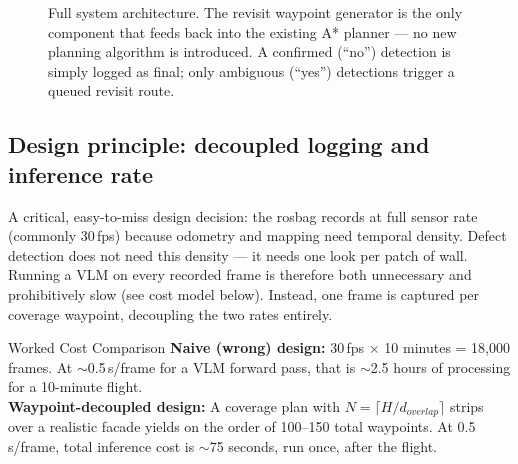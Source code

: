 \documentclass[11pt,a4paper]{article}
\begin{document}
\begin{figure}[h!]
\caption{Full system architecture. The revisit waypoint generator is the only component that feeds back into the existing A* planner --- no new planning algorithm is introduced. A confirmed (``no'') detection is simply logged as final; only ambiguous (``yes'') detections trigger a queued revisit route.}
\label{fig:architecture}
\end{figure}

\subsection{Design principle: decoupled logging and inference rate}
\label{sec:decoupled}

A critical, easy-to-miss design decision: the rosbag records at full sensor rate (commonly 30\,fps) because odometry and mapping need temporal density. Defect detection does not need this density --- it needs one look per patch of wall. Running a VLM on every recorded frame is therefore both unnecessary and prohibitively slow (see cost model below). Instead, one frame is captured per coverage waypoint, decoupling the two rates entirely.

\begin{keybox}{Worked Cost Comparison}
\textbf{Naive (wrong) design:} 30\,fps $\times$ 10 minutes = 18{,}000 frames. At $\sim$0.5\,s/frame for a VLM forward pass, that is $\sim$2.5 hours of processing for a 10-minute flight.\\[4pt]
\textbf{Waypoint-decoupled design:} A coverage plan with $N=\lceil H/d_{overlap}\rceil$ strips over a realistic facade yields on the order of 100--150 total waypoints. At 0.5\,s/frame, total inference cost is $\sim$75 seconds, run once, after the flight.
\end{keybox}
\end{document}
